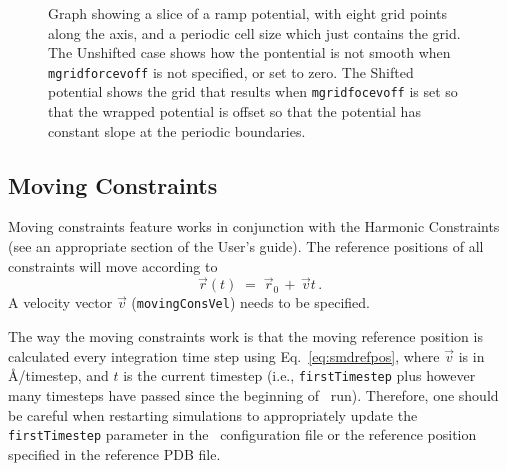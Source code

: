 \begin{itemize}
\begin{figure}[htb]
  \caption[Graph showing a slice of a ramp potential, showing the effect of 
           {\tt mgridforcevoff}]
  {\small Graph showing a slice of a ramp potential, with eight grid points along the axis, and a periodic cell size which just contains the grid. The Unshifted case shows how the pontential is not smooth when {\tt mgridforcevoff} is not specified, or set to zero. The Shifted potential shows the grid that results when {\tt mgridfocevoff} is set so that the wrapped potential is offset so that the potential has constant slope at the periodic boundaries.}
  \label{fig:gridshift}
\end{figure}

\end{itemize}

\subsection{Moving Constraints}

Moving constraints feature works in conjunction with the Harmonic
Constraints (see an appropriate section of the User's guide).
The reference positions of all constraints
will move according to
\begin{equation}
\label{eq:smdrefpos}
   \vec r(t) \; = \; \vec r_0 \, + \, \vec v t \,.
\end{equation}
A velocity vector $\vec v$ ({\tt movingConsVel}) needs to be specified.

The way the moving constraints work is that the moving reference
position is calculated every integration time step using
Eq.~\ref{eq:smdrefpos}, where $\vec v$ is in \AA/timestep, and $t$ is the
current timestep (i.e., {\tt firstTimestep} plus however many
timesteps have passed since the beginning of \NAMD\ run). Therefore,
one should be careful when restarting simulations to appropriately
update the {\tt firstTimestep} parameter in the \NAMD\ configuration
file or the reference position specified in the reference PDB file.

